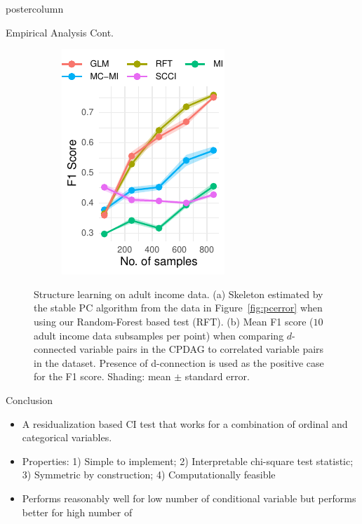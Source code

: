 \documentclass{beamer}
\begin{document}
\begin{frame}
\begin{columns}
\begin{column}{0.33\textwidth}
\begin{beamercolorbox}[center]{postercolumn}
\begin{minipage}{.98\textwidth}
{\begin{myblock}{Empirical Analysis Cont.}
\begin{figure}
\begin{subfigure}[b]{0.6\columnwidth}
								\caption{}
								\label{fig:sl_adult_model}
							\end{subfigure}%
							\begin{subfigure}[b]{0.4\columnwidth}
								\includegraphics[scale=2.7]{../in_person/imgs/adult_F1.pdf}
								\caption{}
								\label{fig:sl_adult}
							\end{subfigure}
							\caption{Structure learning on adult income data. (a) Skeleton
								estimated by the stable PC algorithm from the data in
								Figure~\ref{fig:pcerror} when using our Random-Forest based
								test (RFT). (b) Mean F1 score ($10$ adult income data subsamples
								per point)
								when comparing $d$-connected variable pairs in the CPDAG to
								correlated variable pairs in the dataset. Presence of
								d-connection is used as the positive case for the
								F1 score. Shading: mean $\pm$ standard
								error.}
						\end{figure}
					\end{myblock}\vfill
					\begin{myblock}{Conclusion}
						\begin{itemize}
							\item A residualization based CI test that works for a
								combination of ordinal and categorical variables.
							\item Properties: 1) Simple to implement; 2) Interpretable
								chi-square test statistic; 3) Symmetric by
								construction; 4) Computationally feasible
							\item Performs reasonably well for low number of conditional
								variable but performs better for high number of

\end{itemize}
\end{myblock}}
\end{minipage}
\end{beamercolorbox}
\end{column}
\end{columns}
\end{frame}
\end{document}
